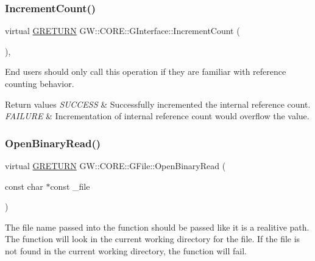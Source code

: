\subsubsection{\texorpdfstring{Increment\+Count()}{IncrementCount()}}
{\footnotesize\ttfamily virtual \hyperlink{namespace_g_w_a69b1aaebac1cac8049825f035884c95b}{G\+R\+E\+T\+U\+RN} G\+W\+::\+C\+O\+R\+E\+::\+G\+Interface\+::\+Increment\+Count (\begin{DoxyParamCaption}{ }\end{DoxyParamCaption})\hspace{0.3cm}{\ttfamily [pure virtual]}, {\ttfamily [inherited]}}

End users should only call this operation if they are familiar with reference counting behavior.


\begin{DoxyRetVals}{Return values}
{\em S\+U\+C\+C\+E\+SS} & Successfully incremented the internal reference count. \\
\hline
{\em F\+A\+I\+L\+U\+RE} & Incrementation of internal reference count would overflow the value. \\
\hline
\end{DoxyRetVals}
\hypertarget{class_g_w_1_1_c_o_r_e_1_1_g_file_aba62e5beb5ee71ed2ba8ef57a352fbdf}{}\label{class_g_w_1_1_c_o_r_e_1_1_g_file_aba62e5beb5ee71ed2ba8ef57a352fbdf} 
\subsubsection{\texorpdfstring{Open\+Binary\+Read()}{OpenBinaryRead()}}
{\footnotesize\ttfamily virtual \hyperlink{namespace_g_w_a69b1aaebac1cac8049825f035884c95b}{G\+R\+E\+T\+U\+RN} G\+W\+::\+C\+O\+R\+E\+::\+G\+File\+::\+Open\+Binary\+Read (\begin{DoxyParamCaption}\item[{const char $\ast$const}]{\+\_\+file }\end{DoxyParamCaption})\hspace{0.3cm}{\ttfamily [pure virtual]}}

The file name passed into the function should be passed like it is a realitive path. The function will look in the current working directory for the file. If the file is not found in the current working directory, the function will fail.


